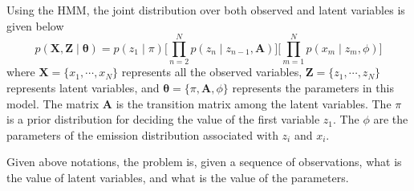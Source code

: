 Using the HMM, the joint distribution over both observed and latent variables is given below
\begin{equation}
	p(\mathbf{X}, \mathbf{Z} \mid \boldsymbol{\theta}) = p(z_1 \mid \pi) \big[\prod_{n=2}^{N}p(z_n\mid z_{n-1}, \mathbf{A})\big] \big[\prod_{m=1}^{N}p(x_m\mid z_m, \phi)\big]
\end{equation}
where \(\mathbf{X} = \{x_1, \cdots, x_N\}\) represents all the observed variables, \(\mathbf{Z} = \{z_1, \cdots, z_N\}\) represents latent variables, and \(\boldsymbol{\theta} = \{\pi, \mathbf{A}, \phi\}\) represents the parameters in this model. The matrix \(\mathbf{A}\) is the transition matrix among the latent variables. The \(\pi\) is a prior distribution for deciding the value of the first variable \(z_1\). The \(\phi\) are the parameters of the emission distribution associated with \(z_i\) and \(x_i\).

Given above notations, the problem is, given a sequence of observations, what is the value of latent variables, and what is the value of the parameters.

